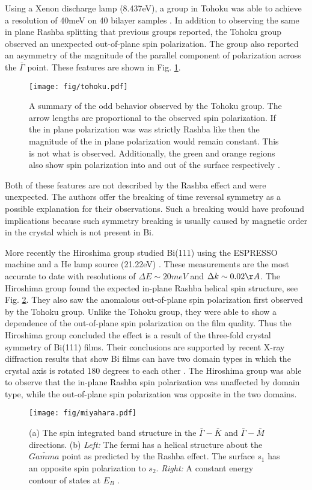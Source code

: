 \documentclass[12pt]{article}
\begin{document}
Using a Xenon discharge lamp (8.437eV), a group in Tohoku was able to achieve a resolution of 40meV on 40 bilayer samples \cite{Takayama}.
In addition to observing the same in plane Rashba splitting that previous groups reported, the Tohoku group observed an unexpected out-of-plane spin polarization.
The group also reported an asymmetry of the magnitude of the parallel component of polarization across the $\bar{\Gamma}$ point.
These features are shown in Fig. \ref{fig:tohoku}.
\begin{figure}[h]
  \centering
  \texttt{[image: fig/tohoku.pdf]}
  \caption{A summary of the odd behavior observed by the Tohoku group.  The arrow lengths are proportional to the observed spin polarization.  If the in plane polarization was was strictly Rashba like then the magnitude of the in plane polarization would remain constant.  This is not what is observed.  Additionally, the green and orange regions also show spin polarization into and out of the surface respectively \cite{Takayama}.}
  \label{fig:tohoku}
\end{figure}
Both of these features are not described by the Rashba effect and were unexpected.
The authors offer the breaking of time reversal symmetry as a possible explanation for their observations.
Such a breaking would have profound implications because such symmetry breaking is usually caused by magnetic order in the crystal which is not present in Bi.

More recently the Hiroshima group studied Bi(111) using the ESPRESSO machine and a He lamp source (21.22eV) \cite{Miyahara}.
These measurements are the most accurate to date with resolutions of $\Delta E\sim20meV$ and $\Delta k\sim0.02\AA$.
The Hiroshima group found the expected in-plane Rashba helical spin structure,  see Fig. \ref{fig:miyahara}.
They also saw the anomalous out-of-plane spin polarization first observed by the Tohoku group.
Unlike the Tohoku group, they were able to show a dependence of the out-of-plane spin polarization on the film quality.
Thus the Hiroshima group concluded the effect is a result of the three-fold crystal symmetry of Bi(111) films.
Their conclusions are supported by recent X-ray diffraction results that show Bi films can have two domain types in which the crystal axis is rotated 180 degrees to each other \cite{Shirasawa}.
The Hiroshima group was able to observe that the in-plane Rashba spin polarization was unaffected by domain type, while the out-of-plane spin polarization was opposite in the two domains.
\begin{figure}[th]
  \centering
  \texttt{[image: fig/miyahara.pdf]}
  \caption{(a) The spin integrated band structure in the $\bar{\Gamma}-\bar{K}$ and $\bar{\Gamma}-\bar{M}$ directions.  (b) \textit{Left:}  The fermi has a helical structure about the $\bar{Gamma}$ point as predicted by the Rashba effect.  The surface $s_1$ has an opposite spin polarization to $s_2$.  \textit{Right:} A constant energy contour of states at $E_B$ \cite{Miyahara}.}
  \label{fig:miyahara}
\end{figure}
\end{document}
